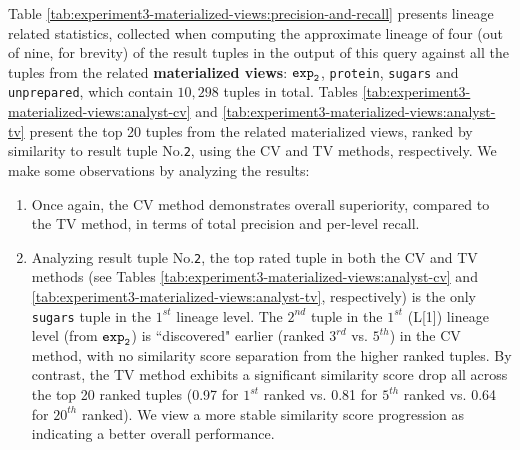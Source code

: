 \begin{experiment-withrun}


Table \ref{tab:experiment3-materialized-views:precision-and-recall} presents lineage related statistics, collected when computing the approximate lineage of four (out of nine, for brevity) of the result tuples in the output of this query against all the tuples from the related \textbf{materialized views}: $\texttt{exp}\sb\texttt{2}$, \texttt{protein}, \texttt{sugars} and \texttt{unprepared}, which contain $10,298$ tuples in total. Tables \ref{tab:experiment3-materialized-views:analyst-cv} and \ref{tab:experiment3-materialized-views:analyst-tv} present the top 20 tuples from the related materialized views, ranked by similarity to result tuple No.\texttt{2}, using the CV and TV methods, respectively. We make some observations by analyzing the results:
\begin{enumerate}
    \item Once again, the CV method demonstrates overall superiority, compared to the TV method, in terms of total precision and per-level recall.
    \item Analyzing result tuple No.\texttt{2}, the top rated tuple in both the CV and TV methods (see Tables \ref{tab:experiment3-materialized-views:analyst-cv} and \ref{tab:experiment3-materialized-views:analyst-tv}, respectively) is the only \texttt{sugars} tuple in the $1^{st}$ lineage level. The $2^{nd}$ tuple in the $1^{st}$ (L[1]) lineage level (from $\texttt{exp}\sb\texttt{2}$) is ``discovered" earlier (ranked $3^{rd}$ vs. $5^{th}$) in the CV method, with no similarity score separation from the higher ranked tuples. By contrast, the TV method exhibits a significant similarity score drop all across the top 20 ranked tuples (0.97 for $1^{st}$ ranked vs. 0.81 for $5^{th}$ ranked vs. 0.64 for $20^{th}$ ranked). We view a more stable similarity score progression as indicating a better overall performance.

\end{enumerate}
\end{experiment-withrun}
